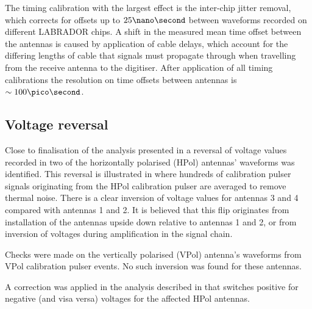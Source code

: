 The timing calibration with the largest effect is the inter-chip jitter removal, which corrects for offsets up to $25 \nano \second$ between waveforms recorded on different LABRADOR chips. A shift in the measured mean time offset between the antennas is caused by application of cable delays, which account for the differing lengths of cable that signals must propagate through when travelling from the receive antenna to the digitiser. After application of all timing calibrations the resolution on time offsets between antennas is $\sim 100 \pico \second$.


\subsection{Voltage reversal}
\label{sec:calibration:Voltage-reversal}

Close to finalisation of the analysis presented in  a reversal of voltage values recorded in two of the horizontally polarised (HPol) antennas' waveforms was identified. This reversal is illustrated in  where hundreds of calibration pulser signals originating from the HPol calibration pulser are averaged to remove thermal noise. There is a clear inversion of voltage values for antennas 3 and 4 compared with antennas 1 and 2. It is believed that this flip originates from installation of the antennas upside down relative to antennas 1 and 2, or from inversion of voltages during amplification in the signal chain. 

Checks were made on the vertically polarised (VPol) antenna's waveforms from VPol calibration pulser events. No such inversion was found for these antennas. 


A correction was applied in the analysis described in  that switches positive for negative (and visa versa) voltages for the affected HPol antennas. 


